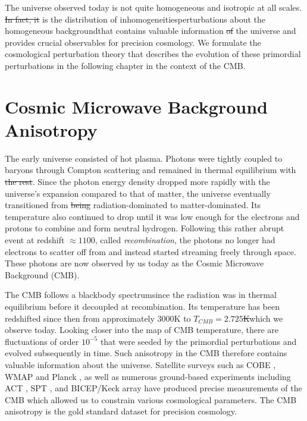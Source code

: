 \documentclass[a4paper,12pt,times,custombib,print,index]{Classes/PhDThesisPSnPDF} %
\providecommand{\DIFadd}[1]{{\protect\color{blue}\uwave{#1}}} %
\providecommand{\DIFdel}[1]{{\protect\color{red}\sout{#1}}}                      %
\providecommand{\DIFaddbegin}{} %
\providecommand{\DIFaddend}{} %
\providecommand{\DIFdelbegin}{} %
\providecommand{\DIFdelend}{} %
\newcommand{\DIFscaledelfig}{0.5}
\newlength{\DIFdelgraphicswidth} %
\newlength{\DIFdelgraphicsheight} %
\newcommand{\DIFaddincludegraphics}[2][]{{\color{blue}\fbox{\DIFOincludegraphics[#1]{#2}}}} %
\newcommand{\DIFdelincludegraphics}[2][]{%
\sbox{\DIFdelgraphicsbox}{\DIFOincludegraphics[#1]{#2}}%
\settoboxwidth{\DIFdelgraphicswidth}{\DIFdelgraphicsbox} %
\settoboxtotalheight{\DIFdelgraphicsheight}{\DIFdelgraphicsbox} %
\scalebox{\DIFscaledelfig}{%
\parbox[b]{\DIFdelgraphicswidth}{\usebox{\DIFdelgraphicsbox}\\[-\baselineskip] \rule{\DIFdelgraphicswidth}{0em}}\llap{\resizebox{\DIFdelgraphicswidth}{\DIFdelgraphicsheight}{%
\setlength{\unitlength}{\DIFdelgraphicswidth}%
\begin{picture}(1,1)%
\thicklines\linethickness{2pt} %
{\color[rgb]{1,0,0}\put(0,0){\framebox(1,1){}}}%
{\color[rgb]{1,0,0}\put(0,0){\line( 1,1){1}}}%
{\color[rgb]{1,0,0}\put(0,1){\line(1,-1){1}}}%
\end{picture}%
}\hspace*{3pt}}} %
} %
\DeclareRobustCommand{\DIFaddbegin}{\DIFOaddbegin \let\includegraphics\DIFaddincludegraphics} %
\DeclareRobustCommand{\DIFaddend}{\DIFOaddend \let\includegraphics\DIFOincludegraphics} %
\DeclareRobustCommand{\DIFdelbegin}{\DIFOdelbegin \let\includegraphics\DIFdelincludegraphics} %
\DeclareRobustCommand{\DIFdelend}{\DIFOaddend \let\includegraphics\DIFOincludegraphics} %
\begin{document}
The universe observed today is not quite homogeneous and isotropic at all scales. \DIFdelbegin \DIFdel{In fact, it }\DIFdelend \DIFaddbegin \DIFadd{It }\DIFaddend is the distribution of inhomogeneities\textemdash perturbations about the homogeneous background\textemdash that contains valuable information \DIFdelbegin \DIFdel{of }\DIFdelend \DIFaddbegin \DIFadd{about }\DIFaddend the universe and provides crucial observables for precision cosmology. We formulate the cosmological perturbation theory that describes the evolution of these primordial perturbations in the following chapter in the context of the CMB.\clearpage{}
\clearpage{}

\chapter{Cosmic Microwave Background Anisotropy}

\ifpdf
    \graphicspath{{Chapter2/Figs/Raster/}{Chapter2/Figs/PDF/}{Chapter2/Figs/}}
\else
    \graphicspath{{Chapter2/Figs/Vector/}{Chapter2/Figs/}}
\fi

The early universe consisted of hot plasma. Photons were tightly coupled to baryons through Compton scattering and remained in thermal equilibrium with \DIFdelbegin \DIFdel{the rest}\DIFdelend \DIFaddbegin \DIFadd{them}\DIFaddend . Since the photon energy density dropped more rapidly with the universe's expansion compared to that of matter, the universe eventually transitioned from \DIFdelbegin \DIFdel{being }\DIFdelend radiation-dominated to matter-dominated. Its temperature also continued to drop until it was low enough for the electrons and protons to combine and form neutral hydrogen. Following this rather abrupt event at redshift $\approx1100$, called \textit{recombination}, the photons no longer had electrons to scatter off from and instead started streaming freely through space. These photons are now observed by us today as the Cosmic Microwave Background (CMB).

The CMB follows a blackbody spectrum\DIFaddbegin \DIFadd{, }\DIFaddend since the radiation was in thermal equilibrium before it decoupled at recombination. Its temperature has been redshifted since then from approximately $3000$K to \DIFdelbegin \DIFdel{$T_{CMB}=2.725$K}\DIFdelend \DIFaddbegin \DIFadd{$T_\text{CMB}=2.725$K, }\DIFaddend which we observe today. Looking closer into the map of CMB temperature, there are fluctuations of order $10^{-5}$ that were seeded by the primordial perturbations and evolved subsequently in time. Such anisotropy in the CMB therefore contains valuable information about the universe.  Satellite surveys such as COBE \cite{Smoot1992cobe}, WMAP \cite{Spergel2003wmapfirst} and Planck \cite{PlanckCollaboration2013paramters}, as well as numerous ground-based experiments including ACT \cite{Dunkley2011act}, SPT \cite{Carlstrom2011spt}, and BICEP/Keck array \cite{Ade2016bicepkeck} have produced precise measurements of the CMB which \DIFaddbegin \DIFadd{have }\DIFaddend allowed us to constrain various cosmological parameters. The CMB anisotropy is the gold standard dataset for precision cosmology.
\end{document}
